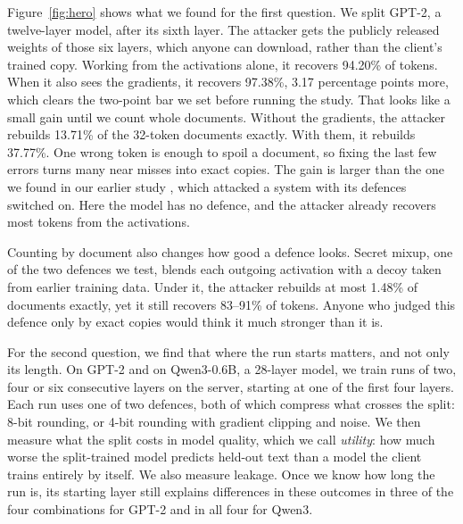 \documentclass[11pt]{article}
\begin{document}
Figure~\ref{fig:hero} shows what we found for the first question. We split GPT-2, a twelve-layer model, after its sixth layer. The attacker gets the publicly released weights of those six layers, which anyone can download, rather than the client's trained copy. Working from the activations alone, it recovers 94.20\% of tokens. When it also sees the gradients, it recovers 97.38\%, 3.17 percentage points more, which clears the two-point bar we set before running the study. That looks like a small gain until we count whole documents. Without the gradients, the attacker rebuilds 13.71\% of the 32-token documents exactly. With them, it rebuilds 37.77\%. One wrong token is enough to spoil a document, so fixing the last few errors turns many near misses into exact copies. The gain is larger than the one we found in our earlier study \cite{politis2026privacyfailure}, which attacked a system with its defences switched on. Here the model has no defence, and the attacker already recovers most tokens from the activations.

Counting by document also changes how good a defence looks. Secret mixup, one of the two defences we test, blends each outgoing activation with a decoy taken from earlier training data. Under it, the attacker rebuilds at most 1.48\% of documents exactly, yet it still recovers 83--91\% of tokens. Anyone who judged this defence only by exact copies would think it much stronger than it is.

For the second question, we find that where the run starts matters, and not only its length. On GPT-2 and on Qwen3-0.6B, a 28-layer model, we train runs of two, four or six consecutive layers on the server, starting at one of the first four layers. Each run uses one of two defences, both of which compress what crosses the split: 8-bit rounding, or 4-bit rounding with gradient clipping and noise. We then measure what the split costs in model quality, which we call \emph{utility}: how much worse the split-trained model predicts held-out text than a model the client trains entirely by itself. We also measure leakage. Once we know how long the run is, its starting layer still explains differences in these outcomes in three of the four combinations for GPT-2 and in all four for Qwen3.
\end{document}
